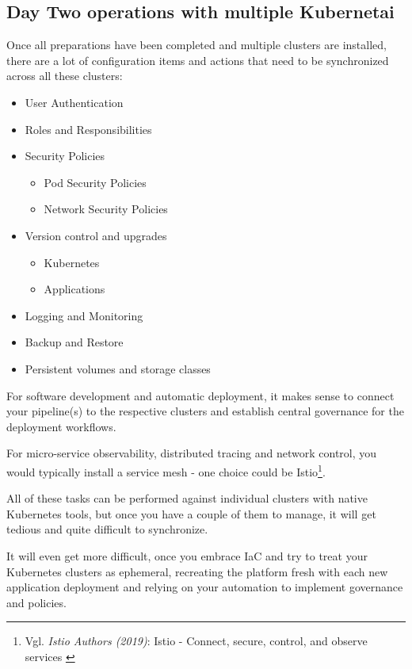 \subsection{Day Two operations with multiple Kubernetai}

Once all preparations have been completed and multiple clusters are installed, there are a lot of configuration items and actions that need to be synchronized across all these clusters:

\begin{itemize}
\item User Authentication
\item Roles and Responsibilities
\item Security Policies
    \begin{itemize}
    \item Pod Security Policies
    \item Network Security Policies
    \end{itemize}
\item Version control and upgrades
    \begin{itemize}
    \item Kubernetes
    \item Applications
    \end{itemize}
\item Logging and Monitoring
\item Backup and Restore
\item Persistent volumes and storage classes
\end{itemize}

For software development and automatic deployment, it makes sense to connect your pipeline(s) to the respective clusters and establish central governance for the deployment workflows.

For micro-service observability, distributed tracing and network control, you would typically install a service mesh - one choice could be Istio\footnote{Vgl. \textit{Istio Authors (2019)}: Istio - Connect, secure, control, and observe services \cite{istio}}.

All of these tasks can be performed against individual clusters with native Kubernetes tools, but once you have a couple of them to manage, it will get tedious and quite difficult to synchronize.

It will even get more difficult, once you embrace IaC and try to treat your Kubernetes clusters as ephemeral, recreating the platform fresh with each new application deployment and relying on your automation to implement governance and policies.

